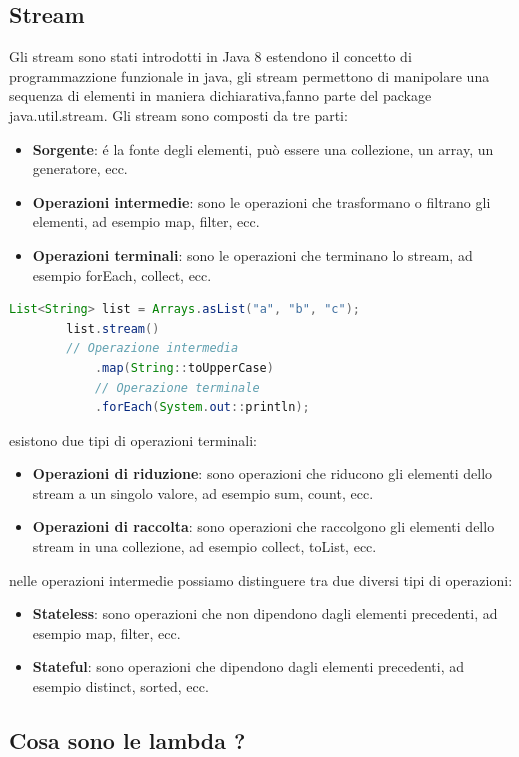 \documentclass[11pt]{article}
\begin{document}
\subsection{Stream}
    Gli stream sono stati introdotti in Java 8 estendono il concetto di programmazzione funzionale in java, gli stream permettono di manipolare una sequenza di elementi in maniera dichiarativa,fanno parte del package java.util.stream.
    Gli stream sono composti da tre parti:
    \begin{itemize}
        \item \textbf{Sorgente}: é la fonte degli elementi, può essere una collezione, un array, un generatore, ecc.
        \item \textbf{Operazioni intermedie}: sono le operazioni che trasformano o filtrano gli elementi, ad esempio map, filter, ecc.
        \item \textbf{Operazioni terminali}: sono le operazioni che terminano lo stream, ad esempio forEach, collect, ecc.
        \end{itemize}
    \begin{lstlisting}[language=Java]
        List<String> list = Arrays.asList("a", "b", "c");
        list.stream()
        // Operazione intermedia
            .map(String::toUpperCase)
            // Operazione terminale
            .forEach(System.out::println);
    \end{lstlisting}
    esistono due tipi di operazioni terminali:
    \begin{itemize}
        \item \textbf{Operazioni di riduzione}: sono operazioni che riducono gli elementi dello stream a un singolo valore, ad esempio sum, count, ecc.
        \item \textbf{Operazioni di raccolta}: sono operazioni che raccolgono gli elementi dello stream in una collezione, ad esempio collect, toList, ecc.
        \end{itemize}
    nelle operazioni intermedie possiamo distinguere tra due diversi tipi di operazioni:
    \begin{itemize}
        \item \textbf{Stateless}: sono operazioni che non dipendono dagli elementi precedenti, ad esempio map, filter, ecc.
        \item \textbf{Stateful}: sono operazioni che dipendono dagli elementi precedenti, ad esempio distinct, sorted, ecc.
        \end{itemize}
\subsection{Cosa sono le lambda ?}
\end{document}
